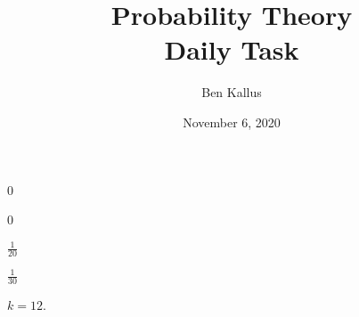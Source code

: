 \documentclass[12pt]{article}
\title{Probability Theory \\ Daily Task}
\author{Ben Kallus}
\date{November 6, 2020}
\begin{document}
\color{white}
\pagecolor{black}
\maketitle

 0

\medskip
{} 0

\medskip
{} $\frac1{20}$

\medskip
{} $\frac1{30}$

\medskip
{} $k=12$.
\end{document}
